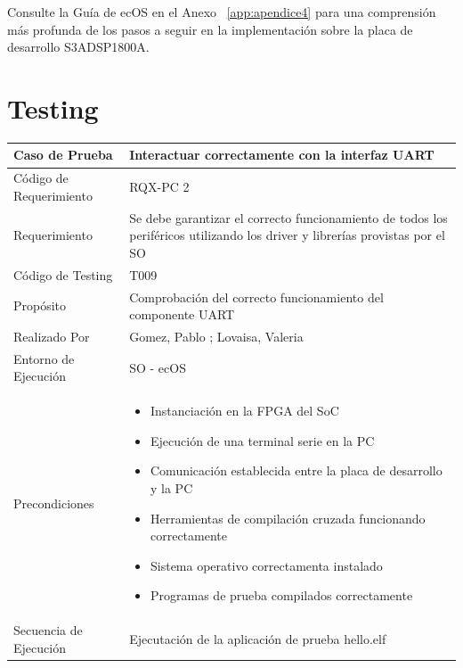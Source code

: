 		Consulte la Guía de ecOS en el Anexo ~\ref{app:apendice4} para una comprensión más profunda de los pasos a seguir en la implementación sobre la
 		placa de desarrollo S3ADSP1800A.
		
\newpage
		\section{Testing}













		\begin{table}[h!]
		\centering
		\begin{tabular}{ p{5cm} p{10cm}  }
		\hline 
		\rowcolor[gray]{0.8}  Caso de Prueba &  Interactuar correctamente con la interfaz UART\\
		\hline 
		Código de Requerimiento & RQX-PC 2\\ 
		\hline 
		Requerimiento & Se debe garantizar el correcto funcionamiento de todos los periféricos utilizando los driver y librerías provistas por el SO \\ 
		\hline 
		Código de Testing & T009\\ 
		\hline
		Propósito &  Comprobación del correcto funcionamiento del componente UART\\
		\hline
		Realizado Por & Gomez, Pablo ; Lovaisa, Valeria \\
		\hline	
		Entorno de Ejecución & SO - ecOS\\
		\hline
		Precondiciones & \begin {itemize}
							\item Instanciación en la FPGA del SoC
							\item Ejecución de una terminal serie en la PC 
 							\item Comunicación establecida entre la placa de desarrollo y la PC
							\item Herramientas de compilación cruzada funcionando correctamente
							\item Sistema operativo correctamenta instalado
							\item Programas de prueba compilados correctamente
							\end {itemize} \\
		\hline
		Secuencia de Ejecución &  Ejecutación de la aplicación de prueba hello.elf\\

\end{tabular}
\end{table}
